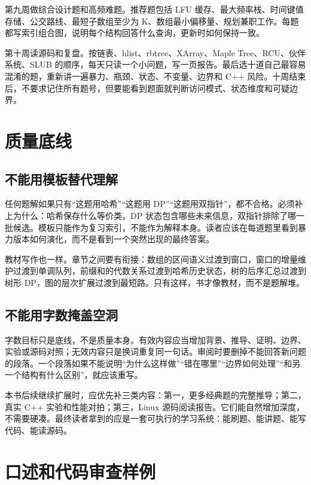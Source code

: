 第九周做综合设计题和高频难题。推荐题包括 LFU 缓存、最大频率栈、时间键值存储、公交路线、最短子数组至少为 K、数组最小偏移量、规划兼职工作。每题都写索引组合图，说明每个结构回答什么查询，更新时如何保持一致。

第十周读源码和复盘。按链表、hlist、rbtree、XArray、Maple Tree、RCU、伙伴系统、SLUB 的顺序，每天只读一个小问题，写一页报告。最后选十道自己最容易混淆的题，重新讲一遍暴力、瓶颈、状态、不变量、边界和 C++ 风险。十周结束后，不要求记住所有题号，但要能看到题面就判断访问模式、状态维度和可疑边界。

\section{质量底线}

\subsection{不能用模板替代理解}

任何题解如果只有“这题用哈希”“这题用 DP”“这题用双指针”，都不合格。必须补上为什么：哈希保存什么等价类，DP 状态包含哪些未来信息，双指针排除了哪一批候选。模板只能作为复习索引，不能作为解释本身。读者应该在每道题里看到暴力版本如何演化，而不是看到一个突然出现的最终答案。

教材写作也一样。章节之间要有衔接：数组的区间语义过渡到窗口，窗口的增量维护过渡到单调队列，前缀和的代数关系过渡到哈希历史状态，树的后序汇总过渡到树形 DP，图的层次扩展过渡到最短路。只有这样，书才像教材，而不是题解堆。

\subsection{不能用字数掩盖空洞}

字数目标只是底线，不是质量本身。有效内容应当增加背景、推导、证明、边界、实验或源码对照；无效内容只是换词重复同一句话。审阅时要删掉不能回答新问题的段落。一个段落如果不能说明“为什么这样做”“错在哪里”“边界如何处理”“和另一个结构有什么区别”，就应该重写。

本书后续继续扩展时，应优先补三类内容：第一，更多经典题的完整推导；第二，真实 C++ 实验和性能对拍；第三，Linux 源码阅读报告。它们能自然增加深度，不需要硬凑。最终读者拿到的应是一套可执行的学习系统：能刷题、能讲题、能写代码、能读源码。

\section{口述和代码审查样例}

